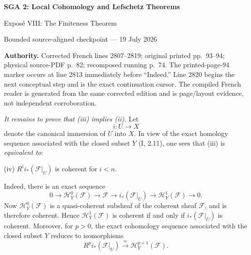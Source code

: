 \documentclass[10pt,a4paper]{article}
\newcommand{\cF}{\mathcal F}
\newcommand{\sH}{\mathcal H}
\newcounter{sourcecondition}
\begin{document}
\begin{center}
  {\Large\bfseries SGA 2: Local Cohomology and Lefschetz Theorems}\par\smallskip
  {\large Expos\'e VIII: The Finiteness Theorem}\par
  \small Bounded source-aligned checkpoint --- 19 July 2026
\end{center}
\noindent\colorbox{softgray}{\parbox{0.95\linewidth}{\footnotesize\textbf{Authority.}
Corrected French lines 2807--2819; original printed pp.~93--94; physical
source-PDF p.~82; recomposed running p.~74. The printed-page-94 marker occurs
at line 2813 immediately before ``Indeed.'' Line 2820 begins the next
conceptual step and is the exact continuation cursor. The compiled French
reader is generated from the same corrected edition and is page/layout
evidence, not independent corroboration.}}

\medskip
\noindent\textit{It remains to prove that \textup{(iii)} implies
\textup{(ii)}.} Let
\[
  i\colon U\longrightarrow X
\]
denote the canonical immersion of $U$ into $X$. In view of the exact homology
sequence associated with the closed subset $Y$ (I, 2.11), one sees that
\textup{(iii)} is \textit{equivalent to}:

\medskip
\noindent\textup{(iv)} $R^i i_*(\cF|_U)$ is coherent for $i<n$.
\label{condition}

\medskip
{}\quad Indeed, there is
an exact sequence
\[
  0\longrightarrow \sH_Y^0(\cF)\longrightarrow \cF
  \longrightarrow i_*(\cF|_U)\longrightarrow \sH_Y^1(\cF)
  \longrightarrow 0.
\]
Now $\sH_Y^0(\cF)$ is a quasi-coherent subsheaf of the coherent sheaf $\cF$,
and is therefore coherent. Hence $\sH_Y^1(\cF)$ is coherent if and only if
$i_*(\cF|_U)$ is coherent. Moreover, for $p>0$, the exact cohomology sequence
associated with the closed subset $Y$ reduces to isomorphisms
\[
  R^p i_*(\cF|_U)\overset{\approx}{\longrightarrow}\sH_Y^{p+1}(\cF).
\]
\end{document}
